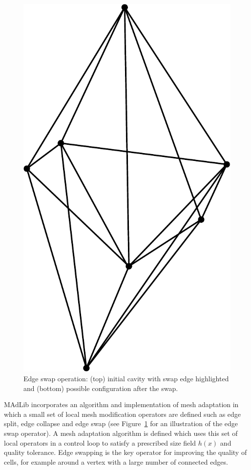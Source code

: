 \begin{figure}
  \includegraphics[width=\twofigs]{chapters/hoffman-2/pdf/swap_config1.pdf}
  \caption{Edge swap operation: (top) initial cavity with swap edge
  highlighted and (bottom) possible configuration after the swap.}
\label{fig:op:eswap}
\end{figure}

MAdLib incorporates an algorithm and implementation of mesh adaptation
in which a small set of local mesh modification operators are defined
such as edge split, edge collapse and edge swap (see
Figure~\ref{fig:op:eswap} for an illustration of the edge swap
operator). A mesh adaptation algorithm is defined which uses this set
of local operators in a control loop to satisfy a prescribed size
field $h(x)$ and quality tolerance. Edge swapping is the key operator
for improving the quality of cells, for example around a vertex with a
large number of connected edges.

